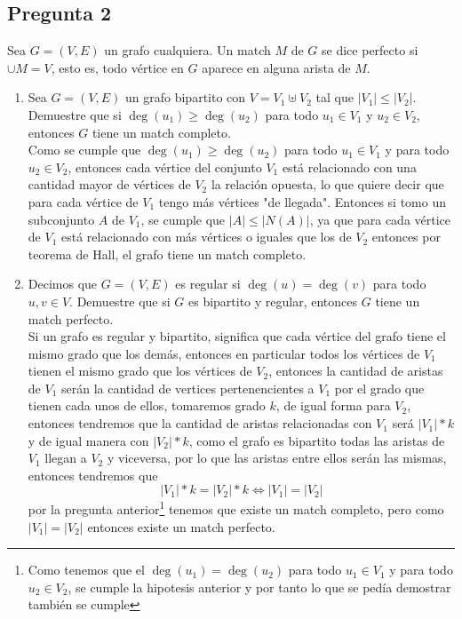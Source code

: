 \documentclass[letter]{article}
\begin{document}
	\begin{pregunta}{2}
	
		\section*{Pregunta 2}
		Sea $G=(V,E)$ un grafo cualquiera. Un match $M$ de $G$ se dice perfecto si $\cup M = V$, esto es, todo vértice en $G$ aparece en alguna arista de $M$.
		\begin{enumerate}
		\item Sea $G=(V,E)$ un grafo bipartito con $V = V_1\uplus V_2$ tal que $|V_1| \leq |V_2|$. Demuestre que si $\deg(u_1)\geq \deg(u_2)$ para todo $u_1\in V_1$ y $u_2 \in V_2$, entonces $G$ tiene un match completo.\\
		Como se cumple que $\deg(u_1)\geq \deg(u_2)$ para todo $u_1 \in V_1$ y para todo $u_2\in V_2$, entonces cada vértice del conjunto $V_1$ está relacionado con una cantidad mayor de vértices de $V_2$ la relación opuesta, lo que quiere decir que para cada vértice de $V_1$ tengo más vértices "de llegada". Entonces si tomo un subconjunto $A$ de $V_1$, se cumple que $|A| \leq |N(A)|$, ya que para cada vértice de $V_1$ está relacionado con más vértices o iguales que los de $V_2$ entonces por teorema de Hall, el grafo tiene un match completo.
		\item Decimos que $G=(V,E)$ es regular si $\deg(u) = \deg(v)$ para todo $u,v\in V$. Demuestre que si $G$ es bipartito y regular, entonces $G$ tiene un match perfecto.\\
		Si un grafo es regular y bipartito, significa que cada vértice del grafo tiene el mismo grado que los demás, entonces en particular todos los vértices de $V_1$ tienen el mismo grado que los vértices de $V_2$, entonces la cantidad de aristas de $V_1$ serán la cantidad de vertices pertenencientes a $V_1$ por el grado que tienen cada unos de ellos, tomaremos grado $k$, de igual forma para $V_2$, entonces tendremos que la cantidad de aristas relacionadas con $V_1$ será $|V_1|*k$ y de igual manera con $|V_2|*k$, como el grafo es bipartito todas las aristas de $V_1$ llegan a $V_2$ y viceversa, por lo que las aristas entre ellos serán las mismas, entonces tendremos que 
		$$|V_1|* k = |V_2|*k \Leftrightarrow |V_1| = |V_2|$$
		por la pregunta anterior\footnote{Como tenemos que el $\deg(u_1)=\deg(u_2)$ para todo $u_1\in V_1$ y para todo $u_2\in V_2$, se cumple la hipotesis anterior y por tanto lo que se pedía demostrar también se cumple} tenemos que existe un match completo, pero como $|V_1| =|V_2|$ entonces existe un match perfecto.
		\end{enumerate}

	\end{pregunta}
\end{document}

